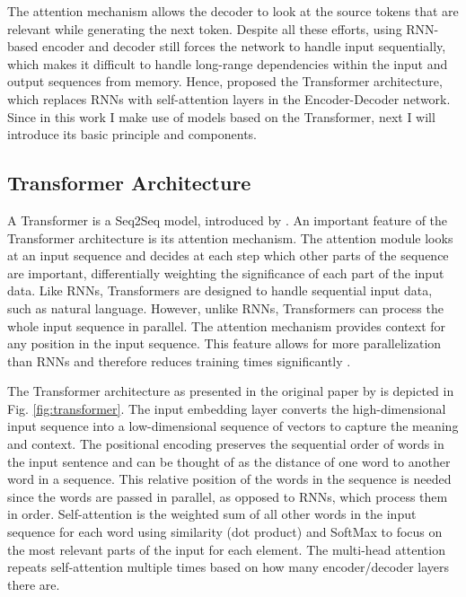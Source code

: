 The attention mechanism allows the decoder to look at the source tokens that are relevant while generating the next token. Despite all these efforts, using RNN-based encoder and decoder still forces the network to handle input sequentially, which makes it difficult to handle long-range dependencies within the input and output sequences from memory. Hence, \cite{transformer} proposed the Transformer architecture, which replaces RNNs with self-attention layers in the Encoder-Decoder network. Since in this work I make use of models based on the Transformer, next I will introduce its basic principle and components.

\subsection{Transformer Architecture}
\label{sec:Background:Transformer}
A Transformer is a Seq2Seq model, introduced by \cite{transformer}. An important feature of the Transformer architecture is its attention mechanism. The attention module looks at an input sequence and decides at each step which other parts of the sequence are important, differentially weighting the significance of each part of the input data. Like RNNs, Transformers are designed to handle sequential input data, such as natural language. However, unlike RNNs, Transformers can process the whole input sequence in parallel. The attention mechanism provides context for any position in the input sequence. This feature allows for more parallelization than RNNs and therefore reduces training times significantly \parencite{transformer}.

The Transformer architecture as presented in the original paper by \cite{transformer} is depicted in Fig. \ref{fig:transformer}.
The input embedding layer converts the high-dimensional input sequence into a low-dimensional sequence of vectors to capture the meaning and context.
The positional encoding preserves the sequential order of words in the input sentence and can be thought of as the distance of one word to another word in a sequence. This relative position of the words in the sequence is needed since the words are passed in parallel, as opposed to RNNs, which process them in order.
Self-attention is the weighted sum of all other words in the input sequence for each word using similarity (dot product) and SoftMax to focus on the most relevant parts of the input for each element. The multi-head attention repeats self-attention multiple times based on how many encoder/decoder layers there are.

